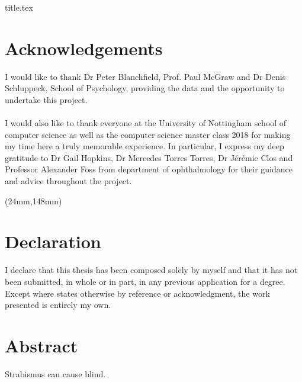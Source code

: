 \documentclass[12pt]{article}
\begin{document}
{title.tex}


\section*{Acknowledgements}
I would like to thank Dr Peter Blanchfield, Prof. Paul McGraw and Dr Denis Schluppeck, School of Psychology, providing the data and the opportunity to undertake this project.
\\
\\
I would also like to thank everyone at the University of Nottingham school of computer science as well as the computer science master class 2018 for making my time here a truly memorable experience. In particular, I express my deep gratitude to Dr Gail Hopkins, Dr Mercedes Torres Torres, Dr Jérémie Clos and Professor Alexander Foss from department of ophthalmology for their guidance and advice throughout the project.



\begin{textblock*}{\textwidth}(24mm,148mm)
\section*{Declaration}
I declare that this thesis has been composed solely by myself and that it has not been submitted, in whole or in part, in any previous application for a degree. Except where states otherwise by reference or acknowledgment, the work presented is entirely my own.
\end{textblock*}





\newpage
\section*{Abstract}
Strabismus can cause blind. 
\newpage
\end{document}
